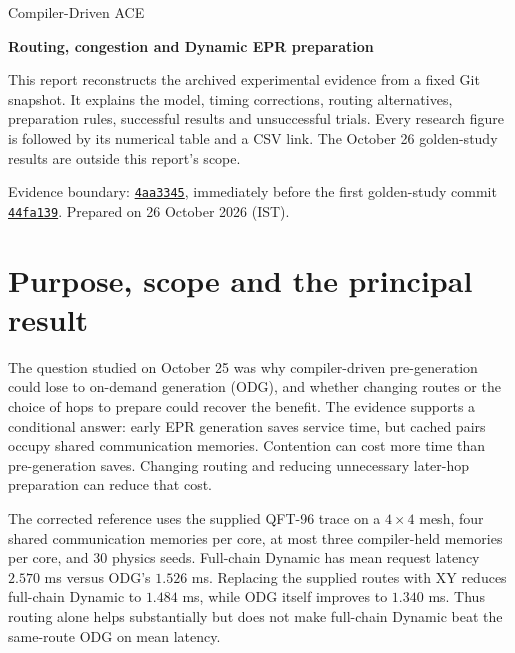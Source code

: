 \documentclass[11pt,a4paper,oneside]{report}
\newcommand{\repo}{https://github.com/sanjeevkrishnaa/Compiler-Driven-ACE}
\newcommand{\commit}[1]{\href{\repo/commit/#1}{\texttt{#1}}}
\begin{document}
\hypersetup{pageanchor=false}
\begin{titlepage}
\centering\vspace*{25mm}
{\Large Compiler-Driven ACE\par}\vspace{12mm}
{\Huge\bfseries Routing, congestion and Dynamic EPR preparation\par}
\vspace{12mm}{\LARGE Research record for 25 October 2026\par}
\vspace{8mm}{\large A fresh retrospective of the experiments before the golden study\par}
\vfill
\begin{minipage}{.88\textwidth}
This report reconstructs the archived experimental evidence from a fixed Git snapshot. It explains the model, timing corrections, routing alternatives, preparation rules, successful results and unsuccessful trials. Every research figure is followed by its numerical table and a CSV link. The October 26 golden-study results are outside this report's scope.

Evidence boundary: \commit{4aa3345}, immediately before the first golden-study commit \commit{44fa139}. Prepared on 26 October 2026 (IST).
\end{minipage}\vspace{18mm}
\end{titlepage}
\hypersetup{pageanchor=true}\tableofcontents\clearpage{}

\chapter{Purpose, scope and the principal result}
The question studied on October 25 was why compiler-driven pre-generation could lose to on-demand generation (ODG), and whether changing routes or the choice of hops to prepare could recover the benefit. The evidence supports a conditional answer: early EPR generation saves service time, but cached pairs occupy shared communication memories. Contention can cost more time than pre-generation saves. Changing routing and reducing unnecessary later-hop preparation can reduce that cost.

The corrected reference uses the supplied QFT-96 trace on a $4\times4$ mesh, four shared communication memories per core, at most three compiler-held memories per core, and 30 physics seeds. Full-chain Dynamic has mean request latency $2.570$ ms versus ODG's $1.526$ ms. Replacing the supplied routes with XY reduces full-chain Dynamic to $1.484$ ms, while ODG itself improves to $1.340$ ms. Thus routing alone helps substantially but does not make full-chain Dynamic beat the same-route ODG on mean latency.
\end{document}
